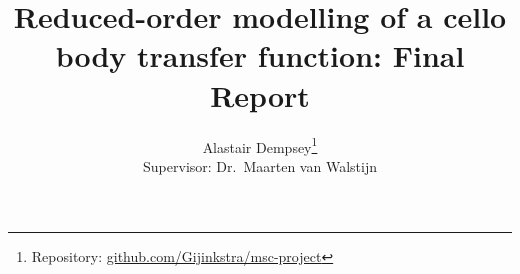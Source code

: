 

\title{Reduced-order modelling of a cello body transfer function: Final Report}
\author{Alastair Dempsey\thanks{
Repository: \href{https://github.com/Gijinkstra/msc-project}
{github.com/Gijinkstra/msc-project}} \\
[1cm]{\small Supervisor: Dr.\ Maarten van Walstijn}}


\maketitle
\newpage
\tableofcontents
\newpage

















\newpage



